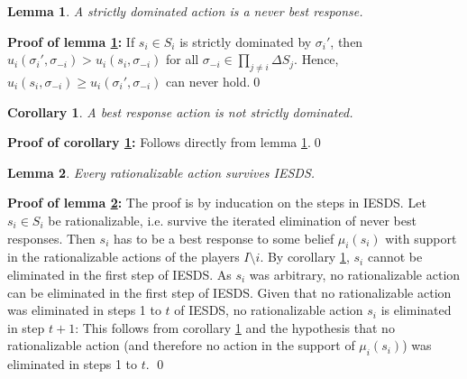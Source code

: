 \documentclass[a4paper,11pt]{article}
\newtheorem{lemma}{Lemma}
\newtheorem{corollary}{Corollary}
\begin{document}
\begin{lemma}\label{lem:sDomNeverBR}
  A strictly dominated action is a never best response.
\end{lemma}
\textbf{Proof of lemma \ref{lem:sDomNeverBR}: }If $s_i\in S_i$ is strictly dominated by $\sigma_i'$, then $u_i(\sigma_i',\sigma_{-i})>u_i(s_i,\sigma_{-i})$ for all $\sigma_{-i}\in \prod_{j\neq i} \Delta S_j$. Hence, $u_i(s_i,\sigma_{-i})\geq u_i(\sigma_i',\sigma_{-i})$ can never hold.\qed

\begin{corollary}\label{cor:brNotSDomed}
  A best response action is not strictly dominated.
\end{corollary}
\textbf{Proof of corollary \ref{cor:brNotSDomed}: }Follows directly from lemma \ref{lem:sDomNeverBR}.\qed

\begin{lemma}\label{lem:ratioInIESDS}
  Every rationalizable action survives IESDS.
\end{lemma}
\textbf{Proof of lemma \ref{lem:ratioInIESDS}: } The proof is by inducation on the steps in IESDS. Let $s_i\in S_i$ be rationalizable, i.e. survive the iterated elimination of never best responses. Then $s_i$ has to be a best response to some belief $\mu_i(s_i)$ with support in the rationalizable actions of the players $I\setminus {i}$. By corollary \ref{cor:brNotSDomed}, $s_i$ cannot be eliminated in the first step of IESDS. As $s_i$ was arbitrary, no rationalizable action can be eliminated in the first step of IESDS. Given that no rationalizable action was eliminated in steps 1 to $t$ of IESDS, no rationalizable action $s_i$ is eliminated in step $t+1$: This follows from corollary \ref{cor:brNotSDomed} and the hypothesis that no rationalizable action (and therefore no action in the support of $\mu_i(s_i)$) was eliminated in steps 1 to $t$. \qed
\end{document}
